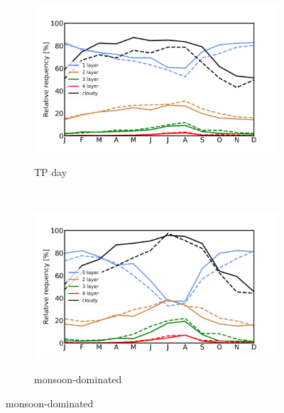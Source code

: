 \documentclass[alpha-refs]{wiley-article}
\begin{document}
\begin{figure}[!htbp]
    \begin{subfigure}[b]{0.5\textwidth}
       \centering
        \caption{TP day}
        \includegraphics[width=\textwidth]{monthly_cld_layer_TP.png}
\label{fig:seasonal_cld_lyr1}
    \end{subfigure}%
    ~ 
    \begin{subfigure}[b]{0.5\textwidth}
        \centering
        \caption{monsoon-dominated}        
        \includegraphics[width=\textwidth]{monthly_cld_layer_monsoon_region.png}
\label{fig:seasonal_cld_lyr2}
    \end{subfigure}
    
    \bigskip


\end{figure}
\end{document}
